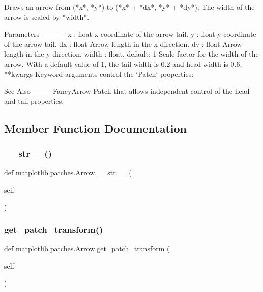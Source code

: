 \begin{DoxyVerb}Draws an arrow from (*x*, *y*) to (*x* + *dx*, *y* + *dy*).
The width of the arrow is scaled by *width*.

Parameters
----------
x : float
    x coordinate of the arrow tail.
y : float
    y coordinate of the arrow tail.
dx : float
    Arrow length in the x direction.
dy : float
    Arrow length in the y direction.
width : float, default: 1
    Scale factor for the width of the arrow. With a default value of 1,
    the tail width is 0.2 and head width is 0.6.
**kwargs
    Keyword arguments control the `Patch` properties:


See Also
--------
FancyArrow
    Patch that allows independent control of the head and tail
    properties.
\end{DoxyVerb}
 

\subsection{Member Function Documentation}
\mbox{\label{classmatplotlib_1_1patches_1_1Arrow_a05fe187eeb22e5ff7ffd70d82820217a}} 
\subsubsection{\texorpdfstring{\+\_\+\+\_\+str\+\_\+\+\_\+()}{\_\_str\_\_()}}
{\footnotesize\ttfamily def matplotlib.\+patches.\+Arrow.\+\_\+\+\_\+str\+\_\+\+\_\+ (\begin{DoxyParamCaption}\item[{}]{self }\end{DoxyParamCaption})}

\mbox{\label{classmatplotlib_1_1patches_1_1Arrow_adec2c8469548cab188a1443647a381db}} 
\subsubsection{\texorpdfstring{get\+\_\+patch\+\_\+transform()}{get\_patch\_transform()}}
{\footnotesize\ttfamily def matplotlib.\+patches.\+Arrow.\+get\+\_\+patch\+\_\+transform (\begin{DoxyParamCaption}\item[{}]{self }\end{DoxyParamCaption})}

